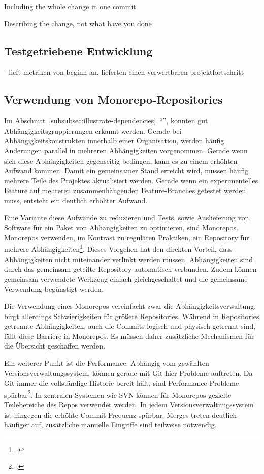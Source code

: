 Including the whole change in one commit

Describing the change, not what have you done

\subsection{Testgetriebene Entwicklung}
\label{test-driven-development}
- lieft metriken von beginn an, lieferten einen verwertbaren projektfortschritt


\subsection{Verwendung von Monorepo-Repositories}

Im Abschnitt~\ref{subsubsec:illustrate-dependencies}~``'', konnten gut Abhängigkeitsgruppierungen erkannt werden. Gerade bei Abhängigkeitskonstrukten innerhalb einer Organisation, werden häufig Änderungen parallel in mehreren Abhängigkeiten vorgenommen. Gerade wenn sich diese Abhängigkeiten gegenseitig bedingen, kann es zu einem erhöhten Aufwand kommen. Damit ein gemeinsamer Stand erreicht wird, müssen häufig mehrere Teile des Projektes aktualisiert werden. Gerade wenn ein experimentelles Feature auf mehreren zusammenhängenden Feature-Branches getestet werden muss, entsteht ein deutlich erhöhter Aufwand.

Eine Variante diese Aufwände zu reduzieren und Tests, sowie Auslieferung von Software für ein Paket von Abhängigkeiten zu optimieren, sind Monorepos. Monorepos verwenden, im Kontrast zu regulären Praktiken, ein Repository für mehrere Abhängigkeiten\footcite{trunkbaseddevelopment-monorepo}. Dieses Vorgehen hat den direkten Vorteil, dass Abhängigkeiten nicht miteinander verlinkt werden müssen. Abhängigkeiten sind durch das gemeinsam geteilte Repository automatisch verbunden. Zudem können gemeinsam verwendete Werkzeug einfach gleichgeschaltet und die gemeinsame Verwendung begünstigt werden.

Die Verwendung eines Monorepos vereinfacht zwar die Abhängigkeitsverwaltung, birgt allerdings Schwierigkeiten für größere Repositories. Während in Repositories getrennte Abhängigkeiten, auch die Commits logisch und physisch getrennt sind, fällt diese Barriere in Monorepos. Es müssen daher zusätzliche Mechanismen für die Übersicht geschaffen werden.

Ein weiterer Punkt ist die Performance. Abhängig vom gewählten Versionsverwaltungssystem, können gerade mit Git hier Probleme auftreten. Da Git immer die vollständige Historie bereit hält, sind Performance-Probleme spürbar\footcite{atlassian-monorepo-git}. In zentralen Systemen wie SVN können für Monorepos gezielte Teilebereiche des Repos verwendet werden. 
In jedem Versionsverwaltungssystem ist hingegen die erhöhte Commit-Frequenz spürbar. Merges treten deutlich häufiger auf, zusätzliche manuelle Eingriffe sind teilweise notwendig.

